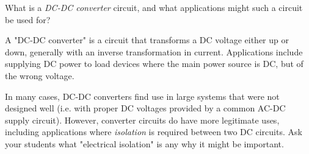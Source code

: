 

What is a {\it DC-DC converter} circuit, and what applications might such a circuit be used for?







A "DC-DC converter" is a circuit that transforms a DC voltage either up or down, generally with an inverse transformation in current.  Applications include supplying DC power to load devices where the main power source is DC, but of the wrong voltage.







In many cases, DC-DC converters find use in large systems that were not designed well (i.e. with proper DC voltages provided by a common AC-DC supply circuit).  However, converter circuits do have more legitimate uses, including applications where {\it isolation} is required between two DC circuits.  Ask your students what "electrical isolation" is any why it might be important.




